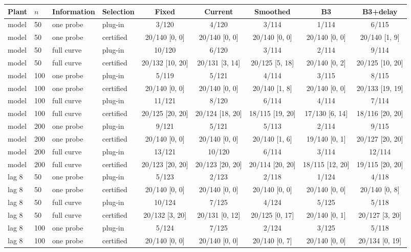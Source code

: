 \begin{tabular}{llllccccc}
\toprule
Plant & $n$ & Information & Selection & Fixed & Current & Smoothed & B3 & B3+delay \\
\midrule
model & 50 & one probe & plug-in & 3/120 & 4/120 & 3/114 & 1/114 & 6/115 \\
model & 50 & one probe & certified & 20/140 [0, 0] & 20/140 [0, 0] & 20/140 [0, 0] & 20/140 [0, 0] & 20/140 [1, 9] \\
model & 50 & full curve & plug-in & 10/120 & 6/120 & 3/114 & 2/114 & 9/114 \\
model & 50 & full curve & certified & 20/132 [10, 20] & 20/131 [3, 14] & 20/125 [5, 18] & 20/140 [0, 2] & 20/125 [10, 20] \\
model & 100 & one probe & plug-in & 5/119 & 5/121 & 4/114 & 3/115 & 8/115 \\
model & 100 & one probe & certified & 20/140 [0, 0] & 20/140 [0, 0] & 20/140 [1, 8] & 20/140 [0, 0] & 20/133 [19, 19] \\
model & 100 & full curve & plug-in & 11/121 & 8/120 & 6/114 & 4/114 & 7/114 \\
model & 100 & full curve & certified & 20/125 [20, 20] & 20/124 [18, 20] & 18/115 [19, 20] & 17/130 [6, 14] & 18/116 [20, 20] \\
model & 200 & one probe & plug-in & 9/121 & 5/121 & 5/113 & 2/114 & 9/115 \\
model & 200 & one probe & certified & 20/140 [0, 0] & 20/140 [0, 0] & 20/140 [1, 6] & 19/140 [0, 1] & 20/127 [20, 20] \\
model & 200 & full curve & plug-in & 13/121 & 10/120 & 6/114 & 3/114 & 12/114 \\
model & 200 & full curve & certified & 20/123 [20, 20] & 20/123 [20, 20] & 20/114 [20, 20] & 18/115 [12, 20] & 19/115 [20, 20] \\
lag 8 & 50 & one probe & plug-in & 5/123 & 2/123 & 2/118 & 1/124 & 4/118 \\
lag 8 & 50 & one probe & certified & 20/140 [0, 0] & 20/140 [0, 0] & 20/140 [0, 0] & 20/140 [0, 0] & 20/140 [0, 8] \\
lag 8 & 50 & full curve & plug-in & 10/124 & 7/125 & 4/124 & 5/125 & 5/118 \\
lag 8 & 50 & full curve & certified & 20/132 [3, 20] & 20/131 [0, 12] & 20/125 [0, 17] & 20/140 [0, 1] & 20/127 [3, 20] \\
lag 8 & 100 & one probe & plug-in & 5/124 & 7/125 & 2/124 & 3/125 & 5/118 \\
lag 8 & 100 & one probe & certified & 20/140 [0, 0] & 20/140 [0, 0] & 20/140 [0, 7] & 20/140 [0, 0] & 20/134 [0, 19] \\

\end{tabular}
